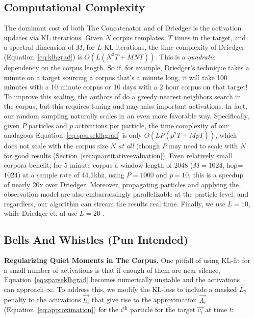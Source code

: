 \documentclass{article}
\begin{document}
\subsection{Computational Complexity} 
\label{sec:complexity}
The dominant cost of both The Concatenator and of Driedger is the activation updates via KL iterations.  Given $N$ corpus templates, $T$ times in the target, and a spectral dimension of $M$, for $L$ KL iterations, the time complexity of Driedger (Equation~\ref{eq:klhgrad}) is $O(L(N^2T + MNT))$.  This is a {\em quadratic} dependency on the corpus length.  So if, for example, Driedger's technique takes a minute on a target sourcing a corpus that's a minute long, it will take 100 minutes with a 10 minute corpus or 10 days with a 2 hour corpus on that target!  To improve this scaling, the authors of \cite{buch2017nichtnegativematrixfaktorisierungnutzendesklangsynthesensystem} do a greedy nearest neighbors search in the corpus, but this requires tuning and may miss important activations.  In fact, our random sampling naturally scales in an even more favorable way.  Specifically, given $P$ particles and $p$ activations per particle, the time complexity of our analagous Equation~\ref{eq:sparseklhgrad} is only $O(LP(p^2T + MpT))$, which does not scale with the corpus size $N$ {\em at all} (though $P$ may need to scale with $N$ for good results (Section~\ref{sec:quantitativeevaluation}).  Even relatively small corpora benefit; for 5 minute corpus a window length of 2048 ($M=1024$, hop=$1024$) at a sample rate of 44.1khz, using $P=1000$ and $p=10$, this is a speedup of nearly 20x over Driedger.  Moreover, propagating particles and applying the observation model are also embarrassingly parallelizable at the particle level, and regardless, our algorithm can stream the results real time.  Finally, we use $L=10$, while Driedger et. al use $L=20$ \cite{driedger2015let}.


\subsection{Bells And Whistles (Pun Intended)}

\textbf{Regularizing Quiet Moments in The Corpus.} One pitfall of using KL-fit for a small number of activations is that if enough of them are near silence, Equation~\ref{eq:sparseklhgrad} becomes numerically unstable and the activations can approach $\infty$.  To address this, we modify the KL-loss to include a masked $L_2$ penalty to the activations $\vec{h_i}$ that give rise to the approximation $\vec{\Lambda_i}$ (Equation~\ref{eq:approximation}) for the $i^{\text{th}}$ particle for the target $\vec{v_t}$ at time $t$:
\end{document}
